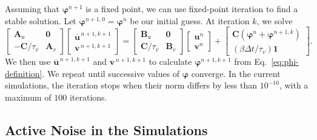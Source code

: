 Assuming that \(\boldsymbol\varphi^{n+1}\) is a fixed point, we can use
fixed-point iteration to find a stable solution.  Let
\(\boldsymbol\varphi^{n+1,0}=\boldsymbol\varphi^n\) be our initial guess.
At iteration \(k\), we solve
\begin{equation}
  \begin{bmatrix}
    \mathbf A_u & \mathbf 0\\
    -\mathbf C/\tau_v & \mathbf A_v
  \end{bmatrix}
  \begin{bmatrix}
    \overline{\boldsymbol u}^{\,n+1,k+1}\\
    \overline{\boldsymbol v}^{\,n+1,k+1}
  \end{bmatrix}
  =
  \begin{bmatrix}
    \mathbf B_u & \mathbf 0\\
    \mathbf C/\tau_v & \mathbf B_v
  \end{bmatrix}
  \begin{bmatrix}
    \boldsymbol u^n\\
    \boldsymbol v^n
  \end{bmatrix}
  +
  \begin{bmatrix}
    \mathbf C\left(
      \boldsymbol\varphi^n+\boldsymbol\varphi^{n+1,k}
    \right)\\
    (\beta\Delta t/\tau_v)\boldsymbol 1
  \end{bmatrix}.
  \label{eq:fixed-point-system}
\end{equation}
We then use \(\overline{\boldsymbol u}^{\,n+1,k+1}\) and
\(\overline{\boldsymbol v}^{\,n+1,k+1}\) to calculate
\(\boldsymbol\varphi^{n+1,k+1}\) from Eq.~\eqref{eq:phi-definition}.  We
repeat until successive values of \(\boldsymbol\varphi\) converge.  In the
current simulations, the iteration stops when their norm differs by less
than \(10^{-10}\), with a maximum of \(100\) iterations.

\subsection{Active Noise in the Simulations}

